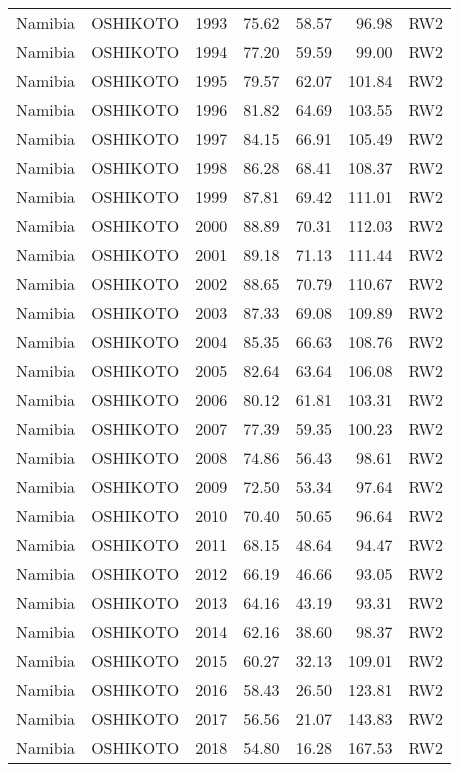 \begin{longtable}{lllrrrl}
  Namibia & OSHIKOTO & 1993 & 75.62 & 58.57 & 96.98 & RW2 \\ 
  Namibia & OSHIKOTO & 1994 & 77.20 & 59.59 & 99.00 & RW2 \\ 
  Namibia & OSHIKOTO & 1995 & 79.57 & 62.07 & 101.84 & RW2 \\ 
  Namibia & OSHIKOTO & 1996 & 81.82 & 64.69 & 103.55 & RW2 \\ 
  Namibia & OSHIKOTO & 1997 & 84.15 & 66.91 & 105.49 & RW2 \\ 
  Namibia & OSHIKOTO & 1998 & 86.28 & 68.41 & 108.37 & RW2 \\ 
  Namibia & OSHIKOTO & 1999 & 87.81 & 69.42 & 111.01 & RW2 \\ 
  Namibia & OSHIKOTO & 2000 & 88.89 & 70.31 & 112.03 & RW2 \\ 
  Namibia & OSHIKOTO & 2001 & 89.18 & 71.13 & 111.44 & RW2 \\ 
  Namibia & OSHIKOTO & 2002 & 88.65 & 70.79 & 110.67 & RW2 \\ 
  Namibia & OSHIKOTO & 2003 & 87.33 & 69.08 & 109.89 & RW2 \\ 
  Namibia & OSHIKOTO & 2004 & 85.35 & 66.63 & 108.76 & RW2 \\ 
  Namibia & OSHIKOTO & 2005 & 82.64 & 63.64 & 106.08 & RW2 \\ 
  Namibia & OSHIKOTO & 2006 & 80.12 & 61.81 & 103.31 & RW2 \\ 
  Namibia & OSHIKOTO & 2007 & 77.39 & 59.35 & 100.23 & RW2 \\ 
  Namibia & OSHIKOTO & 2008 & 74.86 & 56.43 & 98.61 & RW2 \\ 
  Namibia & OSHIKOTO & 2009 & 72.50 & 53.34 & 97.64 & RW2 \\ 
  Namibia & OSHIKOTO & 2010 & 70.40 & 50.65 & 96.64 & RW2 \\ 
  Namibia & OSHIKOTO & 2011 & 68.15 & 48.64 & 94.47 & RW2 \\ 
  Namibia & OSHIKOTO & 2012 & 66.19 & 46.66 & 93.05 & RW2 \\ 
  Namibia & OSHIKOTO & 2013 & 64.16 & 43.19 & 93.31 & RW2 \\ 
  Namibia & OSHIKOTO & 2014 & 62.16 & 38.60 & 98.37 & RW2 \\ 
  Namibia & OSHIKOTO & 2015 & 60.27 & 32.13 & 109.01 & RW2 \\ 
  Namibia & OSHIKOTO & 2016 & 58.43 & 26.50 & 123.81 & RW2 \\ 
  Namibia & OSHIKOTO & 2017 & 56.56 & 21.07 & 143.83 & RW2 \\ 
  Namibia & OSHIKOTO & 2018 & 54.80 & 16.28 & 167.53 & RW2 \\ 

\end{longtable}
